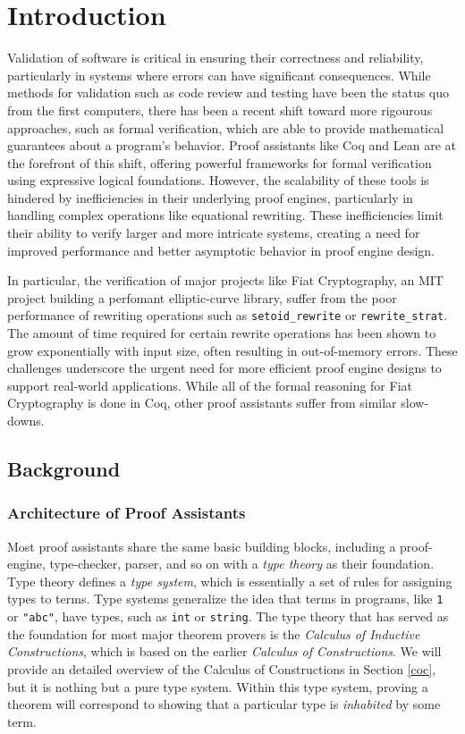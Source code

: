 \documentclass[12pt]{extarticle}
\begin{document}
\section{Introduction}
	Validation of software is critical in ensuring their correctness and reliability, particularly in systems where errors can have significant consequences.
	While methods for validation such as code review and testing have been the status quo from the first computers, there has been a recent shift toward more rigourous approaches, such as formal verification, which are able to provide mathematical guarantees about a program's behavior.
	Proof assistants like Coq \cite{coq} and Lean \cite{lean} are at the forefront of this shift, offering powerful frameworks for formal verification using expressive logical foundations. However, the scalability of these tools is hindered by inefficiencies in their underlying proof engines, particularly in handling complex operations like equational rewriting. 
	These inefficiencies limit their ability to verify larger and more intricate systems, creating a need for improved performance and better asymptotic behavior in proof engine design.


	In particular, the verification of major projects like Fiat Cryptography, an MIT project building a perfomant elliptic-curve library, suffer from the poor performance of rewriting operations such as \texttt{setoid\_rewrite} or \texttt{rewrite\_strat}. 
	The amount of time required for certain rewrite operations has been shown to grow exponentially with input size, often resulting in out-of-memory errors. These challenges underscore the urgent need for more efficient proof engine designs to support real-world applications. While all of the formal reasoning for Fiat Cryptography is done in Coq, other proof assistants suffer from similar slow-downs. 
	
	\subsection{Background}
	\subsubsection{Architecture of Proof Assistants}
	Most proof assistants share the same basic building blocks, including a proof-engine, type-checker, parser, and so on with a \textit{type theory} as their foundation. Type theory defines a \textit{type system}, which is essentially a set of rules for assigning types to terms. Type systems generalize the idea that terms in programs, like \texttt{1} or \texttt{"abc"}, have types, such as \texttt{int} or \texttt{string}. The type theory that has served as the foundation for most major theorem provers is the \textit{Calculus of Inductive Constructions}, which is based on the earlier \textit{Calculus of Constructions}. We will provide an detailed overview of the Calculus of Constructions in Section \ref{coc}, but it is nothing but a pure type system. Within this type system, proving a theorem will correspond to showing that a particular type is \textit{inhabited} by some term. 
\end{document}
